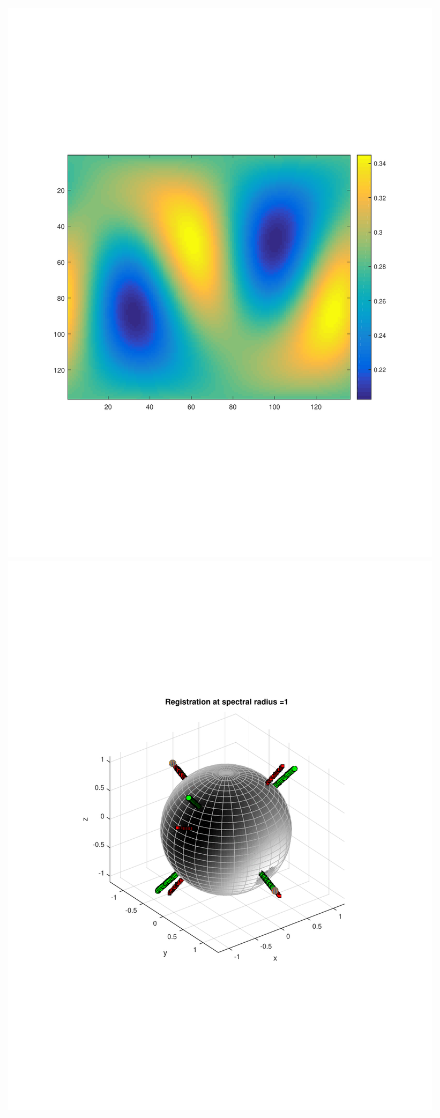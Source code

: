 \documentclass{UCF_ETD}
\begin{document}
\begin{figure}[H]
\begin{center}
\includegraphics[scale=0.3]{RobustRegistration/SphericalImageNoisyTrans_1}
\includegraphics[scale=0.32]{RobustRegistration/NoisyTransReg_1}

\end{center}
\end{figure}
\end{document}
